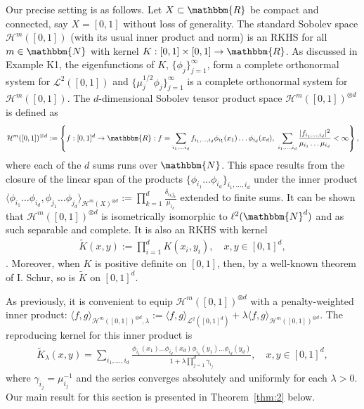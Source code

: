 \documentclass[11pt]{article}
\theoremstyle{definition}
\theoremstyle{remark}
\begin{document}
Our precise setting is as follows. Let $X \subset \mathbbm{R}$ be compact and connected, say $X=[0,1]$ without loss of generality. The standard Sobolev space $\mathcal{H}^m([0,1])$ (with its usual inner product and norm) is an RKHS for all $m \in \mathbbm{N}$ with kernel $K:[0,1] \times [0,1] \to \mathbbm{R}$. As discussed in Example K1, the eigenfunctions of $K$, $\{\phi_j\}_{j=1}^{\infty}$, form a complete orthonormal system for $\mathcal{L}^2([0,1])$ and $\{\mu_j^{1/2} \phi_j\}_{j=1}^{\infty}$ is a complete orthonormal system for $\mathcal{H}^m([0,1])$. The $d$-dimensional Sobolev tensor product space 
$\mathcal{H}^m([0,1])^{\otimes d}$ is defined as
\begin{align*}
\mathcal{H}^m([0,1])^{\otimes d} := \left\{f: [0,1]^d \to \mathbbm{R}: f = \sum_{i_1, \ldots i_d} f_{i_1, \ldots, i_d} \phi_{i_1}(x_1) \ldots \phi_{i_d}(x_d), \ \sum_{i_1, \ldots, i_d} \frac{|f_{i_1, \ldots, i_d}|^2}{\mu_{i_1} \ldots \mu_{i_d}} < \infty \right\},
\end{align*}
where each of the $d$ sums runs over $\mathbbm{N}$. This space results from the closure of the linear span  of the products $\{\phi_{i_1} \ldots \phi_{i_d}\}_{i_1, \ldots, i_d}$ under the inner product  $\langle \phi_{i_1} \ldots \phi_{i_d}, \phi_{j_1} \ldots \phi_{j_d} \rangle_{\mathcal{H}^m(X)^{\otimes d}} := \prod_{k=1}^d \frac{\delta_{i_k j_k}}{\mu_{i_k}}$ extended to finite sums. It can be shown that $\mathcal{H}^m([0,1])^{\otimes d}$ is isometrically isomorphic to $\ell^2(\mathbbm{N}^d)$ and as such separable and complete. It is also an RKHS with kernel 
\begin{align*}
\widetilde{K}(x,y) := \prod_{i=1}^d K(x_i,y_i), \quad x,y \in [0,1]^d,
\end{align*}
\citep[see, e.g.,][Lemma 4.6]{St:2008}. Moreover, when $K$ is positive definite on $[0,1]$, then, by a well-known theorem of I. Schur, so is $\widetilde{K}$ on $[0,1]^d$.

As previously, it is convenient to equip $\mathcal{H}^m([0,1])^{\otimes d}$ with a penalty-weighted inner product: $ \langle f, g \rangle_{\mathcal{H}^m([0,1])^{\otimes d}, \lambda} := \langle f, g \rangle_{\mathcal{L}^2([0,1]^d)} + \lambda \langle f, g \rangle_{\mathcal{H}^m([0,1])^{\otimes d}}$. The reproducing kernel for this inner product is
\begin{align}
\label{eq:tRK}
\widetilde{K}_{\lambda}(x,y) = \sum_{i_1,\ldots, i_d} \frac{\phi_{i_1}(x_1) \ldots \phi_{i_d}(x_d)\phi_{i_1}(y_1) \ldots \phi_{i_d}(y_d)}{1+\lambda \prod_{j=1}^d \gamma_{i_j}}, \quad x, y \in [0,1]^d,
\end{align}
where $\gamma_{i_j} = \mu_{i_j}^{-1}$ and the series converges absolutely and uniformly for each $\lambda>0$.  Our main result for this section is presented in Theorem~\ref{thm:2} below.
\end{document}

